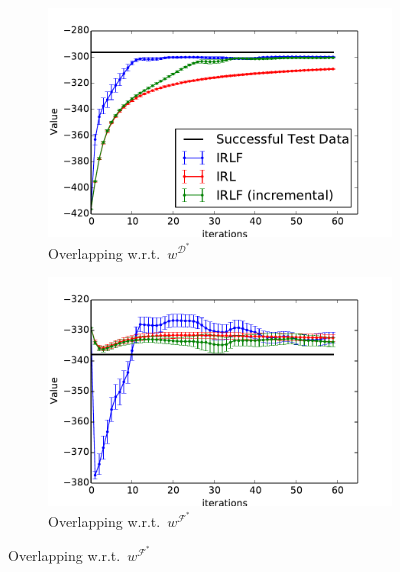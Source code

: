 \documentclass{aamas2016}
\begin{document}
\begin{figure}[t]
      \begin{subfigure}[b]{0.45\columnwidth}
    \includegraphics[trim=0.5cm 0.5cm 0.5cm 0,clip=true,width=\textwidth]{images/expert_apprentice_contrastive.pdf}

    
    \caption{Overlapping w.r.t.\ $w^{\mathcal{D}^*}$}
    \label{fig:toy_expert_apprentice_overlapping}
  \end{subfigure}
  \hfill
  \begin{subfigure}[b]{0.45\columnwidth}
    \includegraphics[trim=0.5cm 0.5cm 0.5cm 0,clip=true,width=\textwidth]{images/taboo_apprentice_contrastive.pdf}

    \caption{Overlapping w.r.t.\ $w^{\mathcal{F}^*}$}
    \label{fig:toy_taboo_apprentice_overlapping}
  \end{subfigure} 


\end{figure}
\end{document}
